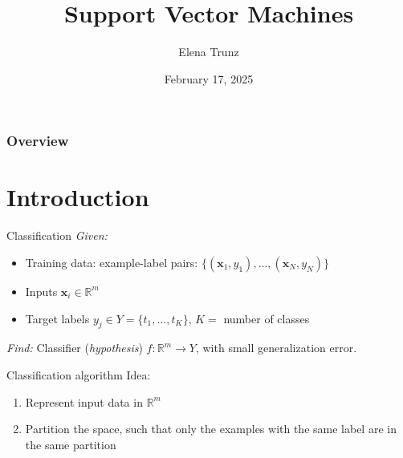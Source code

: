 \documentclass[dvipsnames]{beamer}
\title{Support Vector Machines}
\date{February 17, 2025}%
\institute{Visual Computing Group, University of Bonn}
\author{Elena Trunz}
\begin{document}
    \maketitle

    \begin{frame}
    \frametitle{Overview} 
    \tableofcontents
    \end{frame}

    \section{Introduction}
    \begin{frame}{Classification}
			\emph{Given:} 
			\begin{itemize}
				\item Training data: example-label pairs: $\{(\textbf{x}_1,y_1), \dots, (\textbf{x}_N,y_N)\}$
				\item Inputs $\textbf{x}_i \in \mathbb{R}^m$
				\item Target labels $y_j \in Y = \{t_1, \dots, t_K\}$, $K =$ number of classes %
			\end{itemize}
			
			\emph{Find:} Classifier (\emph{hypothesis}) $f:\mathbb{R}^m \rightarrow Y$, with small generalization error.
    \end{frame}
		
		\begin{frame}{Classification algorithm}
		Idea:
			\begin{enumerate}
				\item Represent input data in $\mathbb{R}^m$ %
				\item Partition the space, such that only the examples with the same label are in the same partition
			\end{enumerate}
    \end{frame}
		
\end{document}
